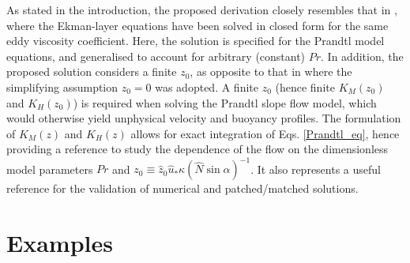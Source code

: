 As stated in the introduction, the proposed derivation closely resembles that in \citet{Nieuwstadt1983a}, where the Ekman-layer equations have been solved in closed form for the same eddy viscosity coefficient. 
Here, the solution is specified for the Prandtl model equations, and generalised to account for arbitrary (constant) $Pr$.
In addition, the proposed solution considers a finite $z_0$, as opposite to that in \citet{Nieuwstadt1983a} where the simplifying assumption $z_0=0$ was adopted. A finite $z_0$ (hence finite $K_M(z_0)$ and $K_H(z_0)$) is required when solving the Prandtl slope flow model, which would otherwise yield unphysical velocity and buoyancy profiles. 
The formulation of $K_M(z)$ and $K_H(z)$ allows for exact integration of Eqs. \ref{Prandtl_eq}, hence providing a reference to study the dependence of the flow on the dimensionless model parameters $Pr$ and $z_0 \equiv \hat{z}_0 \hat{u}_* \kappa (\hat{N} \sin{\alpha})^{-1}$. It also represents a useful reference for the validation of numerical and patched/matched solutions.


\section{Examples}




